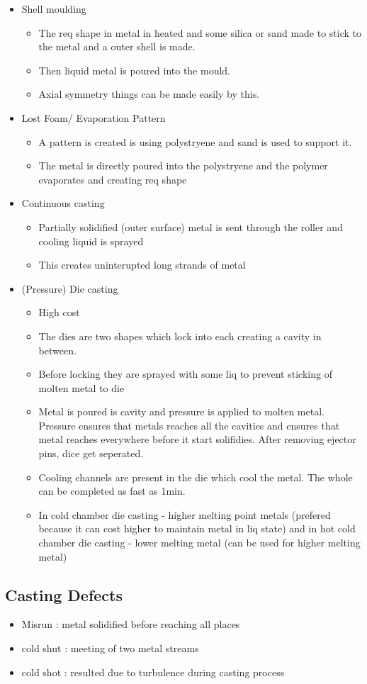 \documentclass{article}
\begin{document}
\begin{itemize}
	
\item Shell moulding
	\begin{itemize}
	\item The req shape in metal in heated and some silica or sand made to stick to the metal and a outer shell is made.
	\item Then liquid metal is poured into the mould.
	\item Axial symmetry things can be made easily by this.
	\end{itemize}


\item Lost Foam/ Evaporation Pattern
	\begin{itemize}
	\item A pattern is created is using polystryene and sand is used to support it.
	\item The metal is directly poured into the polystryene and the polymer evaporates and creating req shape
	\end{itemize}


\item Continuous casting
	\begin{itemize}
	\item Partially solidified (outer surface) metal is sent through the roller and cooling liquid is sprayed
	\item This creates uninterupted long strands of metal

	\end{itemize}



 \item (Pressure) Die casting
 	\begin{itemize}
 	\item High cost
 	\item The dies are two shapes which lock into each creating a cavity in between. 
 	\item Before locking they are sprayed with some liq to prevent sticking of molten metal to die
 	\item Metal is poured is cavity and pressure is applied to molten metal. Pressure ensures that metals reaches all the cavities and ensures that metal reaches everywhere before it start solifidies. After removing ejector pins, dice get seperated.
 	\item Cooling channels are present in the die which cool the metal. The whole can be completed as fast as 1min.
 	\item In cold chamber die casting - higher melting point metals (prefered because it can cost higher to maintain metal in liq state) and in hot cold chamber die casting - lower melting metal (can be used for higher melting metal)
	\end{itemize}


\end{itemize}


\subsection{Casting Defects}
	\begin{itemize}
 	\item Misrun : metal solidified before reaching all places
 	\item cold shut : meeting of two metal streams
 	\item cold shot : resulted due to turbulence during casting process
	\end{itemize}
 	
\end{document}
